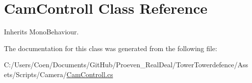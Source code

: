 \hypertarget{class_cam_controll}{}\section{Cam\+Controll Class Reference}
\label{class_cam_controll}


Inherits Mono\+Behaviour.



The documentation for this class was generated from the following file\+:\begin{DoxyCompactItemize}
\item 
C\+:/\+Users/\+Coen/\+Documents/\+Git\+Hub/\+Proeven\+\_\+\+Real\+Deal/\+Tower\+Towerdefence/\+Assets/\+Scripts/\+Camera/\hyperlink{_cam_controll_8cs}{Cam\+Controll.\+cs}\end{DoxyCompactItemize}

